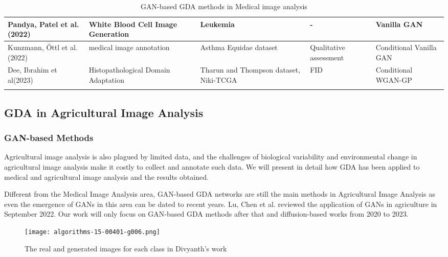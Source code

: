 \documentclass[preprint,12pt,authoryear]{elsarticle}
\begin{document}
{\begin{longtable}{|p{2cm}|p{3cm}|p{2cm}|p{2cm}|p{2cm}|}
Pandya, Patel et al.(2022)\cite{apl32}        & White Blood Cell Image Generation                         & Leukemia                                                          & -                                                        & Vanilla GAN                               \\ \hline
Kunzmann, Öttl et al.(2022)\cite{apl33}       & medical image annotation                                  & Asthma Equidae dataset                                            & Qualitative assessment                                   & Conditional Vanilla GAN                   \\ \hline
Dee, Ibrahim et al(2023)\cite{apl34}          & Histopathological Domain Adaptation                       & Tharun and Thompson dataset, Niki-TCGA                            & FID                                                      & Conditional WGAN-GP   \\ \hline   
\caption{GAN-based GDA methods in Medical image analysis}
\end{longtable}}

\subsection{GDA in Agricultural Image Analysis}
\subsubsection{GAN-based Methods}
Agricultural image analysis is also plagued by limited data, and the challenges of biological variability and environmental change in agricultural image analysis make it costly to collect and annotate such data. We will present in detail how GDA has been applied to medical and agricultural image analysis and the results obtained.

Different from the Medical Image Analysis area, GAN-based GDA networks are still the main methods in Agricultural Image Analysis as even the emergence of GANs in this area can be dated to recent years\cite{apl35}. Lu, Chen et al. reviewed the application of GANs in agriculture in September 2022. Our work will only focus on GAN-based GDA methods after that and diffusion-based works from 2020 to 2023.

\begin{figure}
    \centering
    \centerline{\texttt{[image: algorithms-15-00401-g006.png]}}
    \caption{The real and generated images for each class in Divyanth's work}
    \label{fig:enter-label}
\end{figure}
\end{document}
